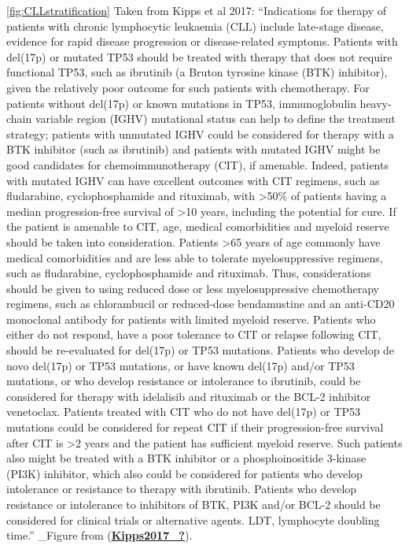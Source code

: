 \documentclass[11pt, a4paper, twosided]{book}
\begin{document}
\ref{fig:CLLstratification} Taken from Kipps et al 2017: ``Indications for therapy of patients with chronic lymphocytic leukaemia (CLL) include late-stage disease, evidence for rapid disease progression or disease-related symptoms. Patients with del(17p) or mutated TP53 should be treated with therapy that does not require functional TP53, such as ibrutinib (a Bruton tyrosine kinase (BTK) inhibitor), given the relatively poor outcome for such patients with chemotherapy. For patients without del(17p) or known mutations in TP53, immunoglobulin heavy-chain variable region (IGHV) mutational status can help to define the treatment strategy; patients with unmutated IGHV could be considered for therapy with a BTK inhibitor (such as ibrutinib) and patients with mutated IGHV might be good candidates for chemoimmunotherapy (CIT), if amenable. Indeed, patients with mutated IGHV can have excellent outcomes with CIT regimens, such as fludarabine, cyclophosphamide and rituximab, with \textgreater50\% of patients having a median progression-free survival of \textgreater10 years, including the potential for cure. If the patient is amenable to CIT, age, medical comorbidities and myeloid reserve should be taken into consideration. Patients \textgreater65 years of age commonly have medical comorbidities and are less able to tolerate myelosuppressive regimens, such as fludarabine, cyclophosphamide and rituximab. Thus, considerations should be given to using reduced dose or less myelosuppressive chemotherapy regimens, such as chlorambucil or reduced-dose bendamustine and an anti-CD20 monoclonal antibody for patients with limited myeloid reserve. Patients who either do not respond, have a poor tolerance to CIT or relapse following CIT, should be re-evaluated for del(17p) or TP53 mutations. Patients who develop de novo del(17p) or TP53 mutations, or have known del(17p) and/or TP53 mutations, or who develop resistance or intolerance to ibrutinib, could be considered for therapy with idelalisib and rituximab or the BCL-2 inhibitor venetoclax. Patients treated with CIT who do not have del(17p) or TP53 mutations could be considered for repeat CIT if their progression-free survival after CIT is \textgreater2 years and the patient has sufficient myeloid reserve. Such patients also might be treated with a BTK inhibitor or a phosphoinositide 3-kinase (PI3K) inhibitor, which also could be considered for patients who develop intolerance or resistance to therapy with ibrutinib. Patients who develop resistance or intolerance to inhibitors of BTK, PI3K and/or BCL-2 should be considered for clinical trials or alternative agents. LDT, lymphocyte doubling time.'' \_Figure from (\protect\hyperlink{ref-Kipps2017_}{\textbf{Kipps2017\_?}}).
\end{document}
